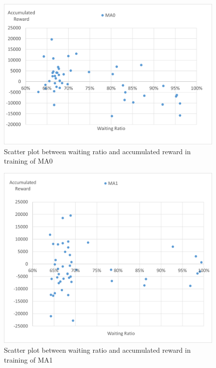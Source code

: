 \begin{figure}[htbp]
  \centering
  \includegraphics[scale=0.5]{./Figure/ma0waitingReward.png}
  \caption{Scatter plot between waiting ratio and accumulated reward in training of MA0}
  \label{fig:ma0waitingReward}
\end{figure}

\begin{figure}[htbp]
  \centering
  \includegraphics[scale=0.5]{./Figure/ma1waitingReward.png}
  \caption{Scatter plot between waiting ratio and accumulated reward in training of MA1}
  \label{fig:ma1waitingReward}
\end{figure}

